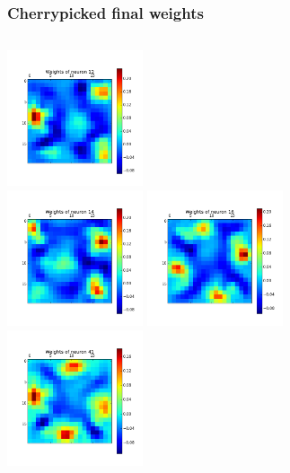 \begin{frame}
\frametitle{Cherrypicked final weights}
\begin{columns}[t]
\centering
\includegraphics[width=4cm,height=4cm]{neurons/neuron_w_12.png}\\
\includegraphics[width=4cm,height=4cm]{neurons/neuron_w_14.png}
\centering
\includegraphics[width=4cm,height=4cm]{neurons/neuron_w_16.png}\\
\includegraphics[width=4cm,height=4cm]{neurons/neuron_w_41.png}
\end{columns}
\end{frame}

